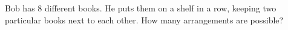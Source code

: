 Bob has $8$ different books. He puts them on a shelf in a row, keeping two particular books next to each other. How many arrangements are possible?
